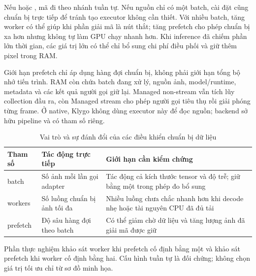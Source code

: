 Nếu  hoặc , mã đi theo nhánh tuần tự. Nếu nguồn chỉ có một batch, cài đặt cũng chuẩn bị trực tiếp để tránh tạo executor không cần thiết. Với nhiều batch, tăng worker có thể giúp khi phần giải mã là nút thắt; tăng prefetch cho phép chuẩn bị xa hơn nhưng không tự làm GPU chạy nhanh hơn. Khi inference đã chiếm phần lớn thời gian, các giá trị lớn có thể chỉ bổ sung chi phí điều phối và giữ thêm pixel trong RAM.

Giới hạn prefetch chỉ áp dụng hàng đợi chuẩn bị, không phải giới hạn tổng bộ nhớ tiến trình. RAM còn chứa batch đang xử lý, nguồn ảnh, model/runtime, metadata và các kết quả người gọi giữ lại. Managed non-stream vẫn tích lũy collection đầu ra, còn Managed stream cho phép người gọi tiêu thụ rồi giải phóng từng frame. Ở native, Klygo không dùng executor này để đọc nguồn; backend sở hữu pipeline và có tham số riêng.

\begin{table}[H]\centering\small
\caption{Vai trò và sự đánh đổi của các điều khiển chuẩn bị dữ liệu}
\begin{tabularx}{\textwidth}{p{2.2cm}YY}
\toprule Tham số & Tác động trực tiếp & Giới hạn cần kiểm chứng \\\midrule
batch & Số ảnh mỗi lần gọi adapter & Tác động cả kích thước tensor và độ trễ; giữ bằng một trong phép đo bổ sung \\
workers & Số luồng chuẩn bị ảnh tối đa & Nhiều luồng chưa chắc nhanh hơn khi decode nhẹ hoặc tài nguyên CPU đã đủ tải \\
prefetch & Độ sâu hàng đợi theo batch & Có thể giảm chờ dữ liệu và tăng lượng ảnh đã giải mã được giữ \\
\bottomrule
\end{tabularx}
\end{table}
Phần thực nghiệm khảo sát worker khi prefetch cố định bằng một và khảo sát prefetch khi worker cố định bằng hai. Cấu hình tuần tự là đối chứng; không chọn giá trị tối ưu chỉ từ sơ đồ minh họa.
